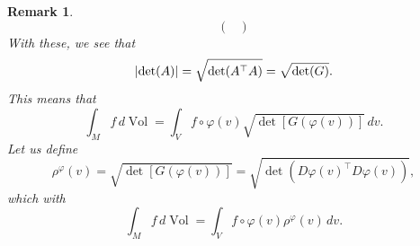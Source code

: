 \documentclass{article}
\renewcommand\det{\operatorname{det}}
\theoremstyle{theorem}
\newtheorem{remark}{Remark}
\newcommand{\Vol}{\operatorname{Vol}}
\begin{document}
\begin{remark}
\begin{equation*}
\begin{pmatrix}
    \end{pmatrix}
\end{equation*}
With these, we see that 
\begin{equation*}
    \abs{\det(A)} = \sqrt{\det(A^\top A)} = \sqrt{\det(G)}.
\end{equation*}
This means that 
\begin{equation*}
    \int_M f\,d\Vol = \int_V f\circ \varphi(v) \sqrt{\det[G(\varphi(v))]}\,dv.
\end{equation*}
Let us define
\begin{equation*}
    \rho^{\varphi}(v) = \sqrt{\det[G(\varphi(v))]} = \sqrt{\det( D \varphi(v)^\top D \varphi(v))},
\end{equation*}
which with
\begin{equation*}
    \int_M f\,d\Vol = \int_V f\circ \varphi(v) \rho^{\varphi}(v)\,dv.
\end{equation*}
\end{remark}
\end{document}
